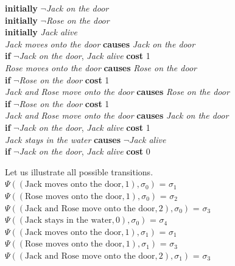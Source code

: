 \documentclass[a4paper]{article}
\begin{document}
\begin{center}
\textbf{initially} $\neg$\textit{Jack on the door} \\[0.1\baselineskip] 
\textbf{initially} $\neg$\textit{Rose on the door} \\[0.1\baselineskip] 
\textbf{initially} \textit{Jack alive} \\[0.5\baselineskip]
\textit{Jack moves onto the door} \textbf{causes} \textit{Jack on the door} \\ \textbf{if} $\neg$\textit{Jack on the door}, \textit{Jack alive} \textbf{cost} 1 \\[0.5\baselineskip]
\textit{Rose moves onto the door} \textbf{causes} \textit{Rose on the door} \\ \textbf{if} $\neg$\textit{Rose on the door} \textbf{cost} 1 \\[0.5\baselineskip]
\textit{Jack and Rose move onto the door} \textbf{causes} \textit{Rose on the door} \\ \textbf{if} $\neg$\textit{Rose on the door} \textbf{cost} 1 \\[0.5\baselineskip]
\textit{Jack and Rose move onto the door} \textbf{causes} \textit{Jack on the door} \\ \textbf{if} $\neg$\textit{Jack on the door}, \textit{Jack alive} \textbf{cost} 1 \\[0.5\baselineskip]
\textit{Jack stays in the water} \textbf{causes} $\neg$\textit{Jack alive} \\ \textbf{if} $\neg$\textit{Jack on the door}, \textit{Jack alive} \textbf{cost} 0 \\[0.5\baselineskip]
\end{center}
Let us illustrate all possible transitions. \\[0.5\baselineskip] 
$\Psi((\text{Jack  moves onto the door},1),\sigma_0)$ = $\sigma_1$ \\[0.1\baselineskip] 
$\Psi((\text{Rose moves onto the door},1),\sigma_0)$ = $\sigma_2$ \\[0.1\baselineskip] 
$\Psi((\text{Jack and Rose move onto the door},2),\sigma_0)$ = $\sigma_3$ \\[0.1\baselineskip] 
$\Psi((\text{Jack stays in the water},0),\sigma_0)$ = $\sigma_4$ \\[0.7\baselineskip] 
$\Psi((\text{Jack moves onto the door},1),\sigma_1)$ = $\sigma_1$ \\[0.1\baselineskip] 
$\Psi((\text{Rose moves onto the door},1),\sigma_1)$ = $\sigma_3$ \\[0.1\baselineskip] 
$\Psi((\text{Jack and Rose move onto the door},2),\sigma_1)$ = $\sigma_3$ \\[0.1\baselineskip]
\end{document}
